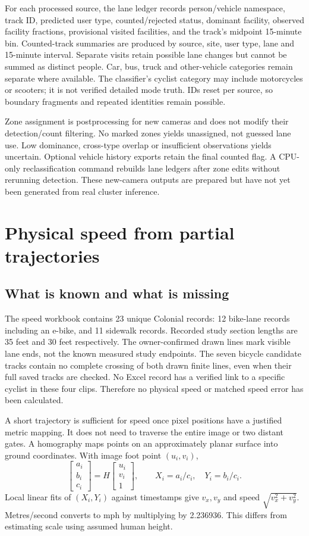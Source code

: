 \documentclass[11pt,letterpaper]{article}
\begin{document}
For each processed source, the lane ledger records person/vehicle namespace, track ID, predicted user type, counted/rejected status, dominant facility, observed facility fractions, provisional visited facilities, and the track's midpoint 15-minute bin. Counted-track summaries are produced by source, site, user type, lane and 15-minute interval. Separate visits retain possible lane changes but cannot be summed as distinct people. Car, bus, truck and other-vehicle categories remain separate where available. The classifier's cyclist category may include motorcycles or scooters; it is not verified detailed mode truth. IDs reset per source, so boundary fragments and repeated identities remain possible.

Zone assignment is postprocessing for new cameras and does not modify their detection/count filtering. No marked zones yields unassigned, not guessed lane use. Low dominance, cross-type overlap or insufficient observations yields uncertain. Optional vehicle history exports retain the final counted flag. A CPU-only reclassification command rebuilds lane ledgers after zone edits without rerunning detection. These new-camera outputs are prepared but have not yet been generated from real cluster inference.

\section{Physical speed from partial trajectories}
\subsection{What is known and what is missing}
The speed workbook contains 23 unique Colonial records: 12 bike-lane records including an e-bike, and 11 sidewalk records. Recorded study section lengths are 35 feet and 30 feet respectively. The owner-confirmed drawn lines mark visible lane ends, not the known measured study endpoints. The seven bicycle candidate tracks contain no complete crossing of both drawn finite lines, even when their full saved tracks are checked. No Excel record has a verified link to a specific cyclist in these four clips. Therefore no physical speed or matched speed error has been calculated.

A short trajectory is sufficient for speed once pixel positions have a justified metric mapping. It does not need to traverse the entire image or two distant gates. A homography maps points on an approximately planar surface into ground coordinates\cite{opencv,calibration}. With image foot point $(u_i,v_i)$,
\[
 \begin{bmatrix}a_i\\b_i\\c_i\end{bmatrix}=H\begin{bmatrix}u_i\\v_i\\1\end{bmatrix},\qquad
 X_i=a_i/c_i,\quad Y_i=b_i/c_i.
\]
Local linear fits of $(X_i,Y_i)$ against timestamps give $v_x,v_y$ and speed $\sqrt{v_x^2+v_y^2}$. Metres/second converts to mph by multiplying by 2.236936. This differs from estimating scale using assumed human height.
\end{document}
